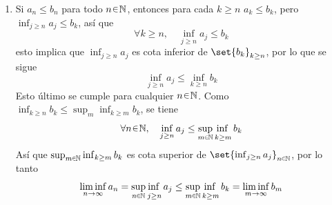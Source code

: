 \begin{sol}
\begin{enumerate}[label=(\roman*)]
\emph{Veamos que la desigualdad puede ser estricta}:\\
Definimos las sucesiones
\[
a_n \coloneq (-1)^n, \qquad b_n \coloneq (-1)^{n+1}.
\]
Entonces $a_n+b_n = 0$ para todo $n\en\mathbb{N}$, así que $\limsup_{n\to\infty}(a_n+b_n) = 0$. 
Sin embargo. $\limsup_{n\to\infty} a_n = 1$ y $\limsup_{n\to\infty} b_n = 1$, de modo que
\[
 \limsup_{n\to\infty}(a_n+b_n) = 0 < 2 = \limsup_{n\to\infty} a_n + \limsup_{n\to\infty}b_n
\]
\item %
Si $a_n\leq b_n$ para todo $n\en\mathbb{N}$, entonces para cada $k\ge n$
$a_k\leq b_k$, pero $\inf_{j\ge n}a_j \leq b_k$, así que
\[
\forall k\ge n,
\quad
\inf_{j\ge n}a_j \leq b_k
\] 
esto implica que $\inf_{j\ge n}a_j$ es cota inferior de $\set{b_k}_{k\ge n}$, por lo que se sigue
\[
\inf_{j\ge n} a_j \leq \inf_{k\ge n}b_k
\]
Esto último se cumple para cualquier $n\en\mathbb{N}$. Como $\inf_{k\ge n} b_k \leq \sup_m\inf_{k\ge m} b_k$, se tiene
\[
\forall n\en\mathbb{N},
\quad
\inf_{j\ge n} a_j \leq \adjustlimits\sup_{m\en\mathbb{N}}\inf_{k\ge m}b_k
\]
Así que $\sup_{m\en\mathbb{N}}\inf_{k\ge m}b_k$ es cota superior de $\set{\inf_{j\ge n} a_j}_{n\en\mathbb{N}}
$, por lo tanto
\[
\liminf_{n\to\infty}a_n%
= \adjustlimits\sup_{n\en\mathbb{N}}\inf_{j\ge n} a_j %
\leq \adjustlimits\sup_{m\en\mathbb{N}}\inf_{k\ge m}b_k 
=\liminf_{m\to\infty}b_m
\]
\end{enumerate}
\end{sol}